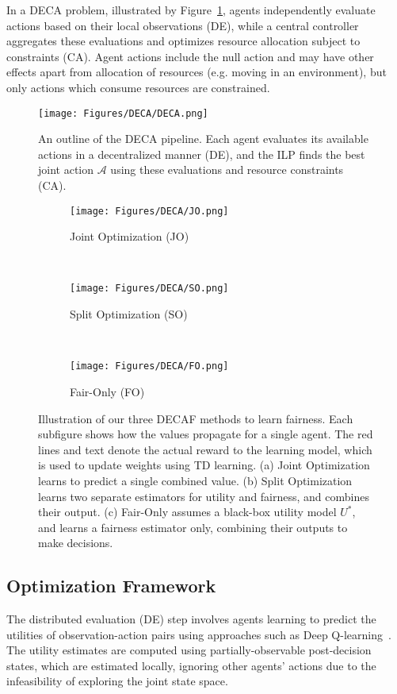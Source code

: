 In a DECA problem, illustrated by Figure~\ref{fig:deca}, agents independently evaluate actions based on their local observations (DE), while a central controller aggregates these evaluations and optimizes resource allocation subject to constraints (CA). 
Agent actions include the null action and may have other effects apart from allocation of resources (e.g. moving in an environment), but only actions which consume resources are constrained. 

\begin{figure}[t]
    \centering
    \texttt{[image: Figures/DECA/DECA.png]}
    \smallskip
    \caption{An outline of the DECA pipeline. Each agent evaluates its available actions in a decentralized manner (DE), and the ILP finds the best joint action $\mathcal{A}$ using these evaluations and resource constraints (CA). }
    \label{fig:deca}
\end{figure}


\begin{figure*}[t]
    \centering
    \begin{subfigure}[t]{0.30\textwidth}
        \centering
        \texttt{[image: Figures/DECA/JO.png]}
        \caption{Joint Optimization (JO)}
    \end{subfigure}
    ~~
    \begin{subfigure}[t]{0.33\textwidth}
        \centering
        \texttt{[image: Figures/DECA/SO.png]}
        \caption{Split Optimization (SO)}
    \end{subfigure}
    ~~
    \begin{subfigure}[t]{0.33\textwidth}
        \centering
        \texttt{[image: Figures/DECA/FO.png]}
        \caption{Fair-Only (FO)}
    \end{subfigure}%
    \caption{Illustration of our three DECAF methods to learn fairness. Each subfigure shows how the values propagate for a single agent. The red lines and text denote the actual reward to the learning model, which is used to update weights using TD learning. (a) Joint Optimization learns to predict a single combined value. (b) Split Optimization learns two separate estimators for utility and fairness, and combines their output. (c) Fair-Only assumes a black-box utility model $U^*$, and learns a fairness estimator only, combining their outputs to make decisions.}
    \label{fig:decaf}
\end{figure*}


\subsection{Optimization Framework}
The distributed evaluation (DE) step involves agents learning to predict the utilities of observation-action pairs using approaches such as Deep Q-learning~\citep{mnih2013playing,van2016DDQN}. The utility estimates are computed using partially-observable post-decision states, which are estimated locally, ignoring other agents' actions due to the infeasibility of exploring the joint state space.


